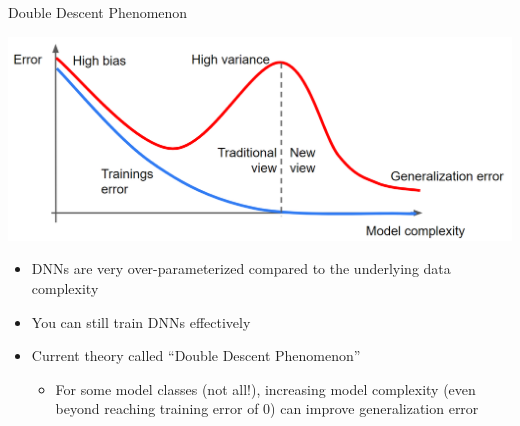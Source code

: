 \documentclass[aspectratio=169]{../latex_main/tntbeamer}  %
\begin{document}
	\begin{frame}{Double Descent Phenomenon}
	\vspace{-2em}
	   \begin{center}
	        \includegraphics[scale=.2]{08_bias_and_variance/figure/double_descent.PNG}   
	   \end{center}
    
    \begin{itemize}
        \item DNNs are very over-parameterized compared to the underlying data complexity
        \item You can still train DNNs effectively
        \item Current theory called ``Double Descent Phenomenon''
        \begin{itemize}
            \item For some model classes (not all!), increasing model complexity (even beyond reaching training error of 0) can improve generalization error
        \end{itemize}
    \end{itemize}    

	\end{frame}
	
	
\end{document}
